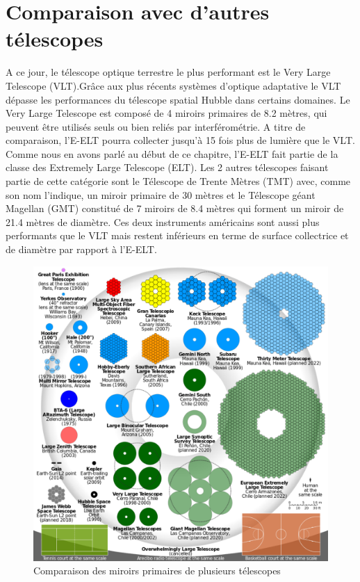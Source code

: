 \newpage

\section{Comparaison avec d'autres télescopes}\label{4.3}

A ce jour, le télescope optique terrestre le plus performant est le Very Large Telescope (VLT).Grâce aux plus récents systèmes d'optique adaptative le VLT dépasse les performances du télescope spatial Hubble dans certains domaines. Le Very Large Telescope est composé de 4 miroirs primaires de 8.2 mètres, qui peuvent être utilisés seuls ou bien reliés par interférométrie.  A titre de comparaison, l'E-ELT pourra collecter jusqu'à 15 fois plus de lumière que le VLT. Comme nous en avons parlé au début de ce chapitre, l'E-ELT fait partie de la classe des Extremely Large Telescope (ELT). Les 2 autres télescopes faisant partie de cette catégorie sont le Télescope de Trente Mètres (TMT) avec, comme son nom l'indique, un miroir primaire de 30 mètres et le Télescope géant Magellan (GMT) constitué de 7 miroirs de 8.4 mètres qui forment un miroir de 21.4 mètres de diamètre. Ces deux instruments américains sont aussi plus performants que le VLT mais restent inférieurs en terme de surface collectrice et de diamètre par rapport à l'E-ELT.  

\begin{figure}[H]
	\centering
	\includegraphics[scale=0.2]{images/comp_tscp}
	\caption[Comparaison des miroirs primaires de plusieurs télescopes]{Comparaison des miroirs primaires de plusieurs télescopes}
	\label{Fig. 4.2}
\end{figure}

